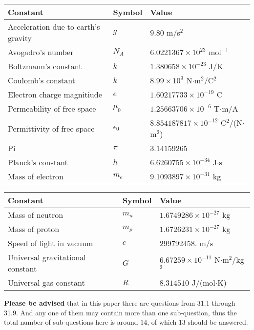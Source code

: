 \documentclass[12pt]{article}
\begin{document}
 
 
\noindent\begin{tabular}{|l|l|l|}
\hline
Constant & Symbol & Value \\
\hline
Acceleration due to earth's gravity &
$g$ &
 $ 9.80 $
m/s$^2$ \\
\hline
Avogadro's number &
$N_A$ &
 $ 6.0221367 \times 10^{23} $
mol$^{-1}$ \\
\hline
Boltzmann's constant &
$k$ &
 $ 1.380658 \times 10^{-23} $
J/K \\
\hline
Coulomb's constant &
$k$ &
 $ 8.99 \times 10^{9} $
N$\cdot $m$^2$/C$^2$ \\
\hline
Electron charge magnitiude &
$e$ &
 $ 1.60217733 \times 10^{-19} $
C \\
\hline
Permeability of free space &
$\mu _0$ &
 $ 1.25663706 \times 10^{-6} $
T$\cdot $m/A \\
\hline
Permittivity of free space &
$\epsilon _0$ &
 $ 8.854187817 \times 10^{-12} $
C$^2$/(N$\cdot $m$^2$) \\
\hline
Pi &
$\pi$ &
 $ 3.14159265 $
$ $ \\
\hline
Planck's constant &
$h$ &
 $ 6.6260755 \times 10^{-34} $
J$\cdot $s \\
\hline
Mass of electron &
$m_e$ &
 $ 9.1093897 \times 10^{-31} $
kg \\
\hline
\end{tabular}
 
 
\noindent\begin{tabular}{|l|l|l|}
\hline
Constant & Symbol & Value \\
\hline
Mass of neutron &
$m_n$ &
 $ 1.6749286 \times 10^{-27} $
kg \\
\hline
Mass of proton &
$m_p$ &
 $ 1.6726231 \times 10^{-27} $
kg \\
\hline
Speed of light in vacuum &
$c$ &
 $ 299792458. $
m/s \\
\hline
Universal gravitational constant &
$G$ &
 $ 6.67259 \times 10^{-11} $
N$\cdot $m$^2$/kg$^2$ \\
\hline
Universal gas constant &
$R$ &
 $ 8.314510 $
J/(mol$\cdot $K) \\
\hline
\end{tabular}
 
 
{\textbf{\large{Please be advised}}} that in this paper there are questions from
31.1 through
31.9.
And any one of them may contain more than one sub-question, thus the total number
of sub-questions here is around 14, of which
13 should be answered.
 
\end{document}
